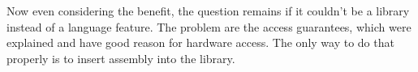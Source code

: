 \documentclass{report}
\begin{document}
Now even considering the benefit, the question remains if it couldn't be a library instead of a language feature. The problem are the access guarantees, which were explained and have good reason for hardware access. The only way to do that properly is to insert assembly into the library.

%
%
%
%
%
%
%
%
\end{document}
